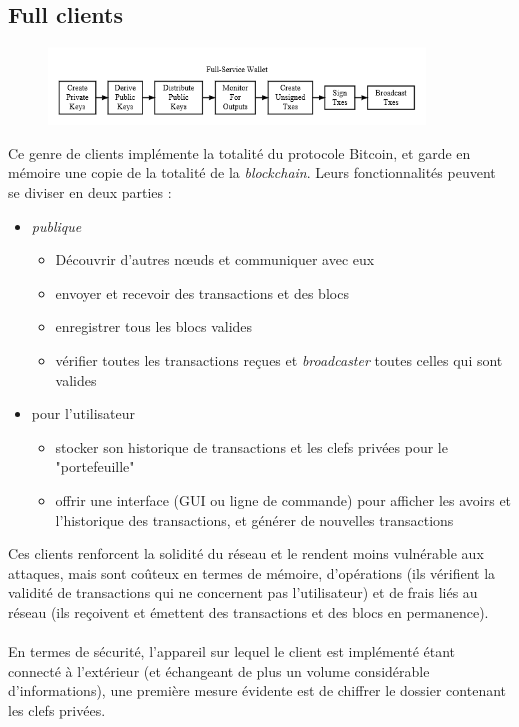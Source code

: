 \documentclass[11pt,a4paper]{article}
\begin{document}
\subsection{Full clients}
\begin{figure}[h]
	\centering
	\includegraphics[width=10cm]{en-wallets-full-service}
\end{figure}
Ce genre de clients implémente la totalité du protocole Bitcoin, et garde en mémoire une copie de la totalité de la \textit{blockchain}. Leurs fonctionnalités peuvent se diviser en deux parties :
\begin{itemize}
	\item \textit{publique}\begin{itemize}
		\item Découvrir d'autres n\oe{}uds et communiquer avec eux
		\item envoyer et recevoir des transactions et des blocs
		\item enregistrer tous les blocs valides
		\item vérifier toutes les transactions reçues et \textit{broadcaster} toutes celles qui sont valides
	\end{itemize}
	\item pour l'utilisateur \begin{itemize}
		\item stocker son historique de transactions et les clefs privées pour le "portefeuille"
		\item offrir une interface (GUI ou ligne de commande) pour afficher les avoirs et l'historique des transactions, et générer de nouvelles transactions
	\end{itemize}
\end{itemize}
Ces clients renforcent la solidité du réseau et le rendent moins vulnérable aux attaques, mais sont coûteux en termes de mémoire, d'opérations (ils vérifient la validité de transactions qui ne concernent pas l'utilisateur) et de frais liés au réseau (ils reçoivent et émettent des transactions et des blocs en permanence).\\\\
En termes de sécurité, l'appareil sur lequel le client est implémenté étant connecté à l'extérieur (et échangeant de plus un volume considérable d'informations), une première mesure évidente est de chiffrer le dossier contenant les clefs privées.
\end{document}

